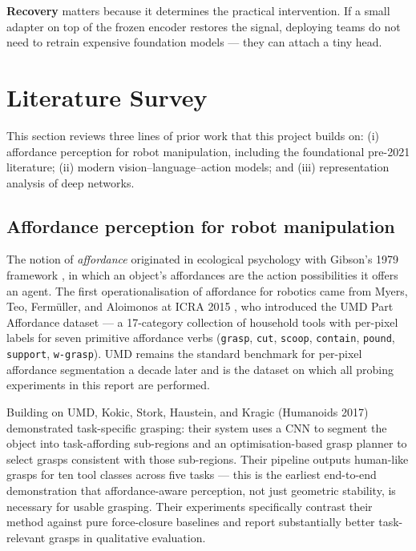 \documentclass[11pt]{article}
\begin{document}
\textbf{Recovery} matters because it determines the practical
intervention. If a small adapter on top of the frozen encoder restores
the signal, deploying teams do not need to retrain expensive
foundation models --- they can attach a tiny head.

\section{Literature Survey}
\label{sec:litsurvey}

This section reviews three lines of prior work that this project builds
on: (i) affordance perception for robot manipulation, including the
foundational pre-2021 literature; (ii) modern vision--language--action
models; and (iii) representation analysis of deep networks.

\subsection{Affordance perception for robot manipulation}

The notion of \emph{affordance} originated in ecological psychology with
Gibson's 1979 framework \cite{gibson1979ecological}, in which an object's
affordances are the action possibilities it offers an agent. The first
operationalisation of affordance for robotics came from Myers, Teo,
Ferm{\"u}ller, and Aloimonos at ICRA 2015 \cite{myers2015umd}, who
introduced the UMD Part Affordance dataset --- a 17-category collection
of household tools with per-pixel labels for seven primitive affordance
verbs (\texttt{grasp}, \texttt{cut}, \texttt{scoop}, \texttt{contain},
\texttt{pound}, \texttt{support}, \texttt{w-grasp}). UMD remains the
standard benchmark for per-pixel affordance segmentation a decade later
and is the dataset on which all probing experiments in this report are
performed.

Building on UMD, Kokic, Stork, Haustein, and Kragic (Humanoids 2017)
\cite{kokic2017affordance} demonstrated task-specific grasping: their
system uses a CNN to segment the object into task-affording sub-regions
and an optimisation-based grasp planner to select grasps consistent with
those sub-regions. Their pipeline outputs human-like grasps for ten tool
classes across five tasks --- this is the earliest end-to-end
demonstration that affordance-aware perception, not just geometric
stability, is necessary for usable grasping. Their experiments
specifically contrast their method against pure force-closure baselines
and report substantially better task-relevant grasps in qualitative
evaluation.
\end{document}
